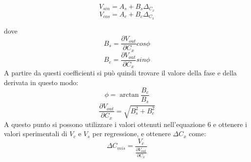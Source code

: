 \documentclass[12pt,]{article}
\begin{document}
$$V_{sin}= A_s + B_s \Delta_{C_x}$$
$$V_{cos} = A_c + B_c \Delta_{C_x}$$

dove 
$$ B_s = \frac{\partial{V_{out}}}{\partial{}C_x} cos \phi $$
$$ B_c =\frac{\partial{V_{out}}}{\partial{}C_x} sin \phi $$
A partire da questi coefficienti si può quindi trovare il valore della fase e della derivata in questo modo: 
\begin{equation}
\phi = \arctan{\frac{B_c}{B_s}}
\end{equation}
\begin{equation}
\frac{\partial{V_{out}}}{\partial{C_x}} = \sqrt{B_s^2 + B_c^2}
\end{equation}
A questo punto si possono utilizzare i valori ottenuti nell'equazione 6 e ottenere i valori sperimentali di $V_c$ e $V_s$ per regressione, e ottenere $\Delta{C_x}$ come:
\begin{equation}
\Delta{C_{mis}} = \frac{V_c}{\frac{\partial{V_{out}}}{\partial{C_x}}}
\end{equation}
\end{document}
